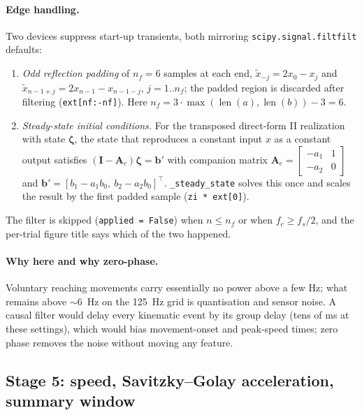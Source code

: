 \documentclass[11pt,a4paper]{article}
\newcommand{\code}[1]{\texttt{\small #1}}
\begin{document}
\paragraph{Edge handling.} Two devices suppress start-up transients, both
mirroring \code{scipy.signal.filtfilt} defaults:
\begin{enumerate}[leftmargin=*,itemsep=1pt]
\item \emph{Odd reflection padding} of $n_f = 6$ samples at each end,
$\tilde x_{-j} = 2x_0 - x_j$ and $\tilde x_{n-1+j} = 2x_{n-1} - x_{n-1-j}$,
$j = 1..n_f$; the padded region is discarded after filtering
(\code{ext[nf:-nf]}). Here $n_f = 3\cdot\max(\operatorname{len}(a),
\operatorname{len}(b)) - 3 = 6$.
\item \emph{Steady-state initial conditions.} For the transposed direct-form II
realization with state $\bm{\zeta}$, the state that reproduces a constant input
$x$ as a constant output satisfies $(\bm{I} - \bm{A}_c)\bm{\zeta} = \bm{b}'$ with
companion matrix
$\bm{A}_c = \begin{bmatrix} -a_1 & 1\\ -a_2 & 0\end{bmatrix}$ and
$\bm{b}' = [b_1 - a_1 b_0,\ b_2 - a_2 b_0]^{\!\top}$.
\code{\_steady\_state} solves this once and scales the result by the first
padded sample (\code{zi * ext[0]}).
\end{enumerate}
The filter is skipped (\code{applied = False}) when $n \le n_f$ or when
$f_c \ge f_s/2$, and the per-trial figure title says which of the two happened.

\paragraph{Why here and why zero-phase.} Voluntary reaching movements carry
essentially no power above a few Hz; what remains above $\sim 6$~Hz on the
125~Hz grid is quantisation and sensor noise. A causal filter would delay every
kinematic event by its group delay (tens of ms at these settings), which would
bias movement-onset and peak-speed times; zero phase removes the noise without
moving any feature.

\subsection{Stage 5: speed, Savitzky--Golay acceleration, summary window}
\label{sec:summary}
\end{document}
